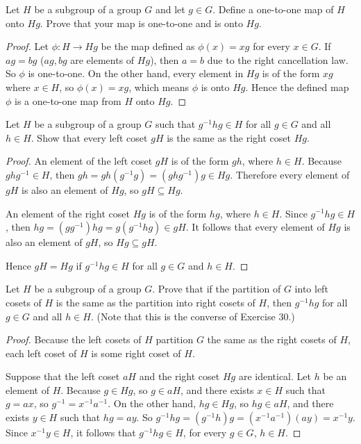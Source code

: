 \newpage
\begin{exercise}
    Let $H$ be a subgroup of a group $G$ and let $g\in G$. Define a one-to-one map of $H$ onto $Hg$. Prove that your map is one-to-one and is onto $Hg$.
\end{exercise}

\begin{proof}
    Let $\phi: H\to Hg$ be the map defined as $\phi(x) = xg$ for every $x\in G$. If $ag = bg$ ($ag, bg$ are elements of $Hg$), then $a = b$ due to the right cancellation law. So $\phi$ is one-to-one. On the other hand, every element in $Hg$ is of the form $xg$ where $x\in H$, so $\phi(x) = xg$, which means $\phi$ is onto $Hg$. Hence the defined map $\phi$ is a one-to-one map from $H$ onto $Hg$.
\end{proof}

\newpage
\begin{exercise}
    Let $H$ be a subgroup of a group $G$ such that $g^{-1}hg\in H$ for all $g\in G$ and all $h\in H$. Show that every left coset $gH$ is the same as the right coset $Hg$.
\end{exercise}

\begin{proof}
    An element of the left coset $gH$ is of the form $gh$, where $h\in H$. Because $ghg^{-1}\in H$, then $gh = gh(g^{-1}g) = (ghg^{-1})g \in Hg$. Therefore every element of $gH$ is also an element of $Hg$, so $gH \subseteq Hg$.

    An element of the right coset $Hg$ is of the form $hg$, where $h\in H$. Since $g^{-1}hg\in H$, then $hg = (gg^{-1})hg = g(g^{-1}hg)\in gH$. It follows that every element of $Hg$ is also an element of $gH$, so $Hg \subseteq gH$.

    Hence $gH = Hg$ if $g^{-1}hg\in H$ for all $g\in G$ and $h\in H$.
\end{proof}

\newpage
\begin{exercise}
    Let $H$ be a subgroup of a group $G$. Prove that if the partition of $G$ into left cosets of $H$ is the same as the partition into right cosets of $H$, then $g^{-1}hg$ for all $g\in G$ and all $h\in H$. (Note that this is the converse of Exercise 30.)
\end{exercise}

\begin{proof}
    Because the left cosets of $H$ partition $G$ the same as the right cosets of $H$, each left coset of $H$ is some right coset of $H$.

    Suppose that the left coset $aH$ and the right coset $Hg$ are identical. Let $h$ be an element of $H$. Because $g\in Hg$, so $g\in aH$, and there exists $x\in H$ such that $g = ax$, so $g^{-1} = x^{-1}a^{-1}$. On the other hand, $hg\in Hg$, so $hg\in aH$, and there exists $y\in H$ such that $hg = ay$. So $g^{-1}hg = (g^{-1}h)g = (x^{-1}a^{-1})(ay) = x^{-1}y$. Since $x^{-1}y\in H$, it follows that $g^{-1}hg\in H$, for every $g\in G$, $h\in H$.
\end{proof}

